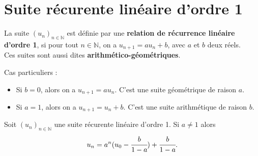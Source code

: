 \documentclass[french]{book}
\newcommand{\N}{\mathbb {N}}
\newcommand{\suite}[1][u]{\left( #1_{n} \right)_{n\in\N}}
\newcommand{\un}{\suite}
\newcommand{\pa}[1]{(#1)}
\begin{document}
\section{Suite récurente linéaire d'ordre 1}

\begin{defn}
La suite $\un$ est définie par une \textbf{relation de récurrence linéaire d'ordre 1}, si pour tout $n\in\N$, on a $u_{n+1}=au_n + b$, avec $a$ et $b$ deux réels.\\
Ces suites sont aussi dites \textbf{arithmético-géométriques}.
\end{defn}

\begin{rem}
Cas particuliers :
\begin{itemize}
	\item Si $b = 0$, alors on a $u_{n+1}=au_n$. C'est une suite géométrique de raison $a$.
	\item Si $a = 1$, alors on a $u_{n+1}=u_n+b$. C'est une suite arithmétique de raison $b$.
\end{itemize}
\end{rem}

\begin{thm}
Soit $\un$ une suite récurente linéaire d'ordre 1. Si $a\neq1$ alors  $$u_n = a^n \pa{u_0-\cfrac{b}{1-a}} + \cfrac{b}{1-a}.$$ 
\end{thm}
\end{document}
